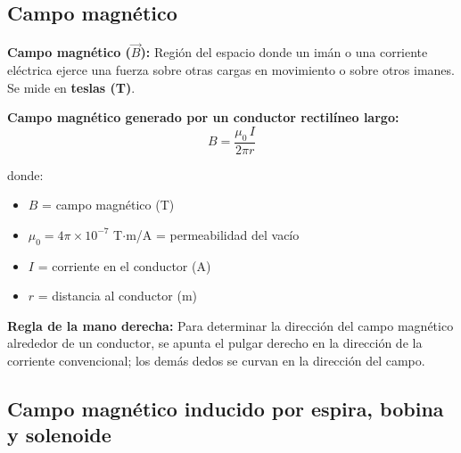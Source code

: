 \subsection{Campo magnético}

\begin{seccion}
\begin{definicion}
\textbf{Campo magnético ($\vec{B}$):} Región del espacio donde un imán o una corriente eléctrica ejerce una fuerza sobre otras cargas en movimiento o sobre otros imanes. Se mide en \textbf{teslas (T)}.
\end{definicion}

\begin{ecuacion}
\textbf{Campo magnético generado por un conductor rectilíneo largo:}
$$B = \frac{\mu_0 \, I}{2\pi r}$$

donde:
\begin{itemize}
    \item $B$ = campo magnético (T)
    \item $\mu_0 = 4\pi \times 10^{-7}$ T$\cdot$m/A = permeabilidad del vacío
    \item $I$ = corriente en el conductor (A)
    \item $r$ = distancia al conductor (m)
\end{itemize}
\end{ecuacion}

\textbf{Regla de la mano derecha:} Para determinar la dirección del campo magnético alrededor de un conductor, se apunta el pulgar derecho en la dirección de la corriente convencional; los demás dedos se curvan en la dirección del campo.
\end{seccion}

\subsection{Campo magnético inducido por espira, bobina y solenoide}

